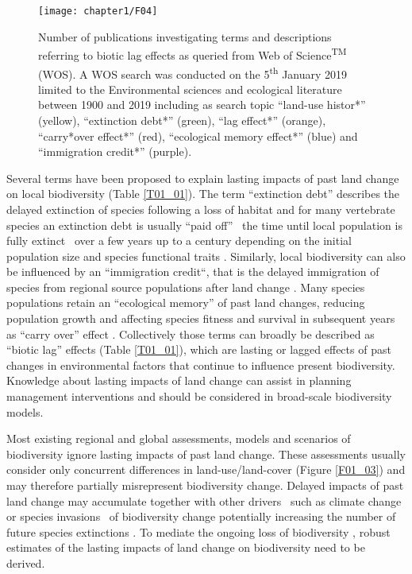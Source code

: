 \begin{figure}[htb]
\centering
\texttt{[image: chapter1/F04]}
\caption{ Number of publications investigating terms and descriptions referring to biotic lag effects as queried from Web of Science\textsuperscript{TM} (WOS). A WOS search was conducted on the 5\textsuperscript{th} January 2019 limited to the Environmental sciences and ecological literature between 1900 and 2019 including as search topic “land-use histor*” (yellow), “extinction debt*” (green), “lag effect*” (orange), “carry*over effect*” (red), “ecological memory effect*” (blue) and “immigration credit*” (purple).  }
\label{F01_04}
\end{figure}

Several terms have been proposed to explain lasting impacts of past land change on local biodiversity (Table \ref{T01_01}). The term “extinction debt” describes the delayed extinction of species following a loss of habitat \citep{Balmford1996,Kuussaari2009,Wearn2012} and for many vertebrate species an extinction debt is usually “paid off” \textendash\ \eg the time until local population is fully extinct \textendash\ over a few years up to a century depending on the initial population size and species functional traits \citep{Halley2016}. Similarly, local biodiversity can also be influenced by an “immigration credit“, that is the delayed immigration of species from regional source populations after land change \citep{Jackson2010,Hylander2013}. Many species populations retain an “ecological memory” \citep{Peterson2002,Bengtsson2003,Ogle2015} of past land changes, reducing population growth and affecting species fitness and survival in subsequent years as “carry over” effect \citep{Harrison2011}. Collectively those terms can broadly be described as “biotic lag” effects (Table \ref{T01_01}), which are lasting or lagged effects of past changes in environmental factors that continue to influence present biodiversity. Knowledge about lasting impacts of land change can assist in planning management interventions \citep{Standish2014} and should be considered in broad-scale biodiversity models.  

Most existing regional and global assessments, models and scenarios of biodiversity \citep[\eg \ those included in the Intergovernmental Science-Policy Platform on Biodiversity and Ecosystem Services (IPBES) assessments, ][]{Alkemade2009,Pereira2010,Newbold2015} ignore lasting impacts of past land change. These assessments usually consider only concurrent differences in land-use/land-cover (Figure \ref{F01_03}) and may therefore partially misrepresent biodiversity change. Delayed impacts of past land change may accumulate together with other drivers \textendash\ such as climate change or species invasions \textendash\ of biodiversity change \citep{Essl2015,Essl2015a} potentially increasing the number of future species extinctions \citep{Dullinger2013}. To mediate the ongoing loss of biodiversity \citep{Mace2018}, robust estimates of the lasting impacts of land change on biodiversity need to be derived.

